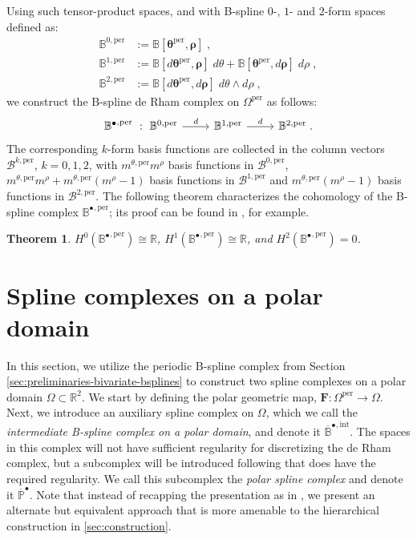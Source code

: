 \documentclass[10pt]{article}
\newcommand{\mbf}[1]{{\boldsymbol{#1}}}
\newcommand{\RR}{{\mathbb{R}}}
\newcommand{\isomorphic}{\cong}
\newcommand{\basis}[1]{\mathcal{#1}}
\newcommand{\vSpace}[1]{\mathbb{#1}}
\newcommand{\complex}[1]{\mathit{\vSpace{#1}^\bullet}}
\newcommand{\cU}{\theta}
\newcommand{\cV}{\rho}
\newcommand{\dcU}{\mathit{d\cU}}
\newcommand{\dcV}{\mathit{d\cV}}
\newcommand{\kntU}{\cU}
\newcommand{\kntV}{\cV}
\newcommand{\kntsU}{\mbf{\kntU}}
\newcommand{\kntsV}{\mbf{\kntV}}
\newcommand{\pkntsU}{\kntsU^\per}
\newcommand{\ndofV}{m^\cV}
\newcommand{\bsp}{B}
\newcommand{\bspB}{\basis{\bsp}}
\newcommand{\bspS}{\vSpace{\bsp}}
\newcommand{\tpF}[2]{\bspS^{#1}}
\newcommand{\tpB}[2]{\bspB^{#1}}
\newcommand{\per}{\mathrm{per}}
\newcommand{\pndofU}{m^{\cU,\per}}
\newcommand{\polar}{P}
\newcommand{\tint}{\mathrm{int}}
\newcommand{\qDomain}{\Omega^{\per}}
\newcommand{\polarDomain}{\Omega}
\theoremstyle{plain}
\newtheorem{theorem}{Theorem}[section]
\theoremstyle{definition}
\theoremstyle{remark}
\begin{document}
Using such tensor-product spaces, and with B-spline $0$-, $1$- and $2$-form spaces defined as:
\begin{equation}\label{eq:periodic-bsplineForms}
  \begin{split}
    \tpF{0,\per}{\pkntsU,\kntsV} &:= \bspS[\pkntsU,\kntsV]\;,\\
    \tpF{1,\per}{\pkntsU,\kntsV} &:= \bspS[d\pkntsU,\kntsV]\;\dcU + \bspS[\pkntsU,d\kntsV]\;\dcV\;,\\
    \tpF{2,\per}{\pkntsU,\kntsV} &:= \bspS[d\pkntsU,d\kntsV]\;\dcU\wedge \dcV\;,
  \end{split}
\end{equation}
we construct the B-spline de Rham complex on $\qDomain$ as follows:
\begin{equation}
  \begin{tikzcd}
    \complex{\bsp}^{,\per}~:~ \tpF{0,\per}{\pkntsU,\kntsV} \arrow{r}{d} & \tpF{1,\per}{\pkntsU,\kntsV} \arrow{r}{d} & \tpF{2,\per}{\pkntsU,\kntsV}\;.
  \end{tikzcd}
\end{equation}
The corresponding $k$-form basis functions are collected in the column vectors $\tpB{k,\per}{\pkntsU,\kntsV}$, $k = 0,1,2$, with $\pndofU\ndofV$ basis functions in $\tpB{0,\per}{\kntsU,\kntsV}$, $\pndofU\ndofV + \pndofU(\ndofV-1)$ basis functions in $\tpB{1,\per}{\kntsU,\kntsV}$ and $\pndofU(\ndofV-1)$ basis functions in $\tpB{2,\per}{\kntsU,\kntsV}$.
The following theorem characterizes the cohomology of the B-spline complex $\complex{\bsp}^{,\per}$; its proof can be found in \cite{Toshniwal:2021}, for example.
\begin{theorem}\label{thm:bspline-cohomology-periodic}
  $H^0(\complex{\bsp}^{,\per}) \isomorphic \RR$, $H^1(\complex{\bsp}^{,\per}) \isomorphic \RR$, and $H^2(\complex{\bsp}^{,\per}) = 0$.
\end{theorem}
\section{Spline complexes on a polar domain}\label{sec:preliminaries-polar}

In this section, we utilize the periodic B-spline complex from Section \ref{sec:preliminaries-bivariate-bsplines} to construct two spline complexes on a polar domain $\polarDomain \subset \RR^2$.
We start by defining the polar geometric map, $\mbf{F} : \qDomain \rightarrow \polarDomain$.
Next, we introduce an auxiliary spline complex on $\polarDomain$, which we call the \emph{intermediate B-spline complex on a polar domain}, and denote it $\complex{\overline{\bsp}}^{,\tint}$.
The spaces in this complex will not have sufficient regularity for discretizing the de Rham complex, but a subcomplex will be introduced following \cite{Toshniwal:2021} that does have the required regularity.
We call this subcomplex the \emph{polar spline complex} and denote it $\complex{\overline{\polar}}$.
Note that instead of recapping the presentation as in \cite{Toshniwal:2021}, we present an alternate but equivalent approach that is more amenable to the hierarchical construction in \cref{sec:construction}.
\end{document}
